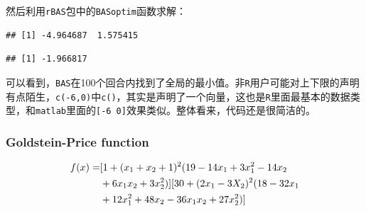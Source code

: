 \documentclass[]{ctexbook}
\newenvironment{Shaded}{\begin{snugshade}}{\end{snugshade}}
\newcommand{\KeywordTok}[1]{\textcolor[rgb]{0.13,0.29,0.53}{\textbf{#1}}}
\newcommand{\DataTypeTok}[1]{\textcolor[rgb]{0.13,0.29,0.53}{#1}}
\newcommand{\DecValTok}[1]{\textcolor[rgb]{0.00,0.00,0.81}{#1}}
\newcommand{\StringTok}[1]{\textcolor[rgb]{0.31,0.60,0.02}{#1}}
\newcommand{\CommentTok}[1]{\textcolor[rgb]{0.56,0.35,0.01}{\textit{#1}}}
\newcommand{\OtherTok}[1]{\textcolor[rgb]{0.56,0.35,0.01}{#1}}
\newcommand{\OperatorTok}[1]{\textcolor[rgb]{0.81,0.36,0.00}{\textbf{#1}}}
\newcommand{\NormalTok}[1]{#1}
\begin{document}
然后利用\texttt{rBAS}包中的\texttt{BASoptim}函数求解：

\begin{Shaded}
\end{Shaded}

\begin{verbatim}
## [1] -4.964687  1.575415
\end{verbatim}

\begin{Shaded}
\end{Shaded}

\begin{verbatim}
## [1] -1.966817
\end{verbatim}

可以看到，\texttt{BAS}在100个回合内找到了全局的最小值。非\texttt{R}用户可能对上下限的声明有点陌生，\texttt{c(-6,0)}中\texttt{c()}，其实是声明了一个向量，这也是\texttt{R}里面最基本的数据类型，和\texttt{matlab}里面的\texttt{{[}-6\ 0{]}}效果类似。整体看来，代码还是很简洁的。

\subsubsection{Goldstein-Price function}\label{BASgold}

\begin{equation}
\begin{split}
f({x})=& [1+(x_1+x_2+1)^2(19-14x_1+3x_1^2-14x_2\notag \\
& +6x_1x_2+3x_2^2)][30+(2x_1-3X_2)^2(18-32x_1\notag  \\
& +12x_1^2+48x_2-36x_1x_2+27x_2^2)]\notag
\end{split}
\end{equation}
\end{document}
